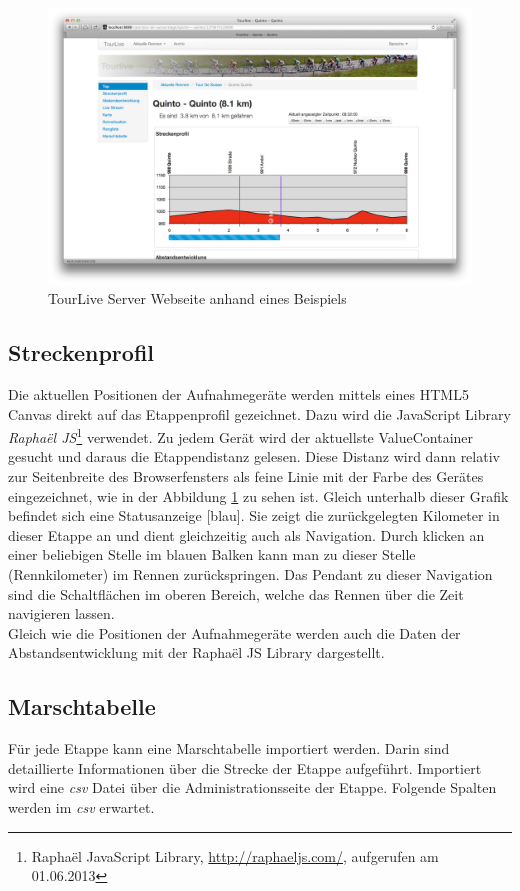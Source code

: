 \begin{figure}[H]
	\centering
	\includegraphics[width=130mm]{images/tourliveweb/tourlivewebansicht.png}
	\caption{TourLive Server Webseite anhand eines Beispiels}
	\label{fig:tourlivewebansicht}
\end{figure}

\subsection{Streckenprofil}
Die aktuellen Positionen der Aufnahmegeräte werden mittels eines HTML5 Canvas direkt auf das Etappenprofil gezeichnet. Dazu wird die JavaScript Library \textit{Raphaël JS}\footnote{Raphaël JavaScript Library, \url{http://raphaeljs.com/}, aufgerufen am 01.06.2013} verwendet. Zu jedem Gerät wird der aktuellste ValueContainer gesucht und daraus die Etappendistanz gelesen. Diese Distanz wird dann relativ zur Seitenbreite des Browserfensters als feine Linie mit der Farbe des Gerätes eingezeichnet, wie in der Abbildung \ref{fig:tourlivewebansicht} zu sehen ist. Gleich unterhalb dieser Grafik befindet sich eine Statusanzeige [blau]. Sie zeigt die zurückgelegten Kilometer in dieser Etappe an und dient gleichzeitig auch als Navigation. Durch klicken an einer beliebigen Stelle im blauen Balken kann man zu dieser Stelle (Rennkilometer) im Rennen zurückspringen. Das Pendant zu dieser Navigation sind die Schaltflächen im oberen Bereich, welche das Rennen über die Zeit navigieren lassen.
\\

Gleich wie die Positionen der Aufnahmegeräte werden auch die Daten der Abstandsentwicklung mit der Raphaël JS Library dargestellt.

\subsection{Marschtabelle}
Für jede Etappe kann eine Marschtabelle importiert werden. Darin sind detaillierte Informationen über die Strecke der Etappe aufgeführt. Importiert wird eine \textit{\gls{csv}} Datei über die Administrationsseite der Etappe. Folgende Spalten werden im \textit{\gls{csv}} erwartet.


